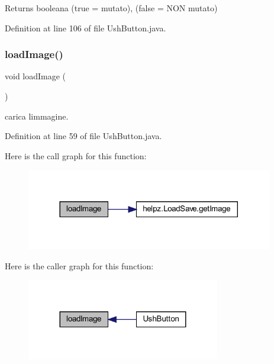 \begin{DoxyReturn}{Returns}
booleana (true = mutato), (false = N\+ON mutato) 
\end{DoxyReturn}


Definition at line 106 of file Ush\+Button.\+java.

\mbox{\label{classui_1_1_ush_button_aeee4cf1bbe51fdc2f9c344e4c20cee76}} 
\subsubsection{\texorpdfstring{load\+Image()}{loadImage()}}
{\footnotesize\ttfamily void load\+Image (\begin{DoxyParamCaption}{ }\end{DoxyParamCaption})\hspace{0.3cm}{\ttfamily [private]}}



carica l\textquotesingle{}immagine. 



Definition at line 59 of file Ush\+Button.\+java.

Here is the call graph for this function\+:\nopagebreak
\begin{figure}[H]
\begin{center}
\leavevmode
\includegraphics[width=305pt]{classui_1_1_ush_button_aeee4cf1bbe51fdc2f9c344e4c20cee76_cgraph}
\end{center}
\end{figure}
Here is the caller graph for this function\+:\nopagebreak
\begin{figure}[H]
\begin{center}
\leavevmode
\includegraphics[width=239pt]{classui_1_1_ush_button_aeee4cf1bbe51fdc2f9c344e4c20cee76_icgraph}
\end{center}
\end{figure}
\mbox{\label{classui_1_1_ush_button_a4506144774b5a18385cf2eb0f4ff5e42}} 
